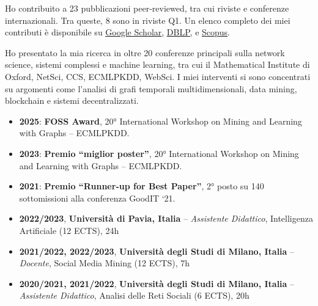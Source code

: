 \documentclass[11pt, a4paper]{awesome-cv}
\begin{document}
\begin{refsection}



Ho contribuito a 23 pubblicazioni peer-reviewed, tra cui riviste e conferenze internazionali. Tra queste, 8 sono in riviste Q1. Un elenco completo dei miei contributi è disponibile su \underline{\href{https://scholar.google.com/citations?user=xRpvJ78AAAAJ&hl=it}{Google Scholar}}, \underline{\href{https://dblp.uni-trier.de/pid/247/1543.html}{DBLP}}, e \underline{\href{https://www.scopus.com/authid/detail.uri?authorId=57210572544}{Scopus}}.  


Ho presentato la mia ricerca in oltre 20 conferenze principali sulla network science, sistemi complessi e machine learning, tra cui il Mathematical Institute di Oxford, NetSci, CCS, ECMLPKDD, WebSci. I miei interventi si sono concentrati su argomenti come l'analisi di grafi temporali multidimensionali, data mining, blockchain e sistemi decentralizzati.



\begin{itemize}
    \item \textbf{2025}: \textbf{FOSS Award}, 20° International Workshop on Mining and Learning with Graphs – ECMLPKDD.
    \item \textbf{2023}: \textbf{Premio “miglior poster”}, 20° International Workshop on Mining and Learning with Graphs – ECMLPKDD.
    \item \textbf{2021}: \textbf{Premio “Runner‑up for Best Paper”}, 2° posto su 140 sottomissioni alla conferenza GoodIT ‘21.
\end{itemize}



\begin{itemize}
    \item \textbf{2022/2023}, \textbf{Università di Pavia, Italia} – \textit{Assistente Didattico}, Intelligenza Artificiale (12 ECTS), 24h  
    \item \textbf{2021/2022, 2022/2023}, \textbf{Università degli Studi di Milano, Italia} – \textit{Docente}, Social Media Mining (12 ECTS), 7h  
    \item \textbf{2020/2021, 2021/2022}, \textbf{Università degli Studi di Milano, Italia} – \textit{Assistente Didattico}, Analisi delle Reti Sociali (6 ECTS), 20h  
\end{itemize}


\end{refsection}
\end{document}
